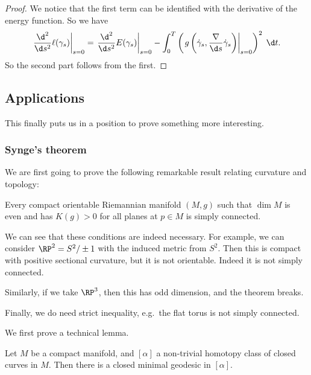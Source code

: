 \documentclass[a4paper]{article}
\begin{document}
\begin{proof}
  We notice that the first term can be identified with the derivative of the energy function. So we have
  \[
    \left.\frac{\d^2}{\d s^2} \ell(\gamma_s) \right|_{s = 0} = \left.\frac{\d^2}{\d s^2} E(\gamma_s)\right|_{s = 0} - \int_0^T \left( \left.g\left(\dot{\gamma}_s, \frac{\nabla}{\d s} \dot{\gamma}_s\right)\right|_{s = 0}\right)^2\;\d t.
  \]
  So the second part follows from the first.
\end{proof}

\subsection{Applications}
This finally puts us in a position to prove something more interesting.

\subsubsection*{Synge's theorem}
We are first going to prove the following remarkable result relating curvature and topology:
\begin{thm}
  Every compact orientable Riemannian manifold $(M, g)$ such that $\dim M$ is even and has $K(g) > 0$ for all planes at $p \in M$ is simply connected.
\end{thm}

We can see that these conditions are indeed necessary. For example, we can consider $\RP^2 = S^2/\pm 1$ with the induced metric from $S^2$. Then this is compact with positive sectional curvature, but it is not orientable. Indeed it is not simply connected.

Similarly, if we take $\RP^3$, then this has odd dimension, and the theorem breaks.

Finally, we do need strict inequality, e.g.\ the flat torus is not simply connected.

We first prove a technical lemma.
\begin{lemma}
  Let $M$ be a compact manifold, and $[\alpha]$ a non-trivial homotopy class of closed curves in $M$. Then there is a closed minimal geodesic in $[\alpha]$.
\end{lemma}
\end{document}
